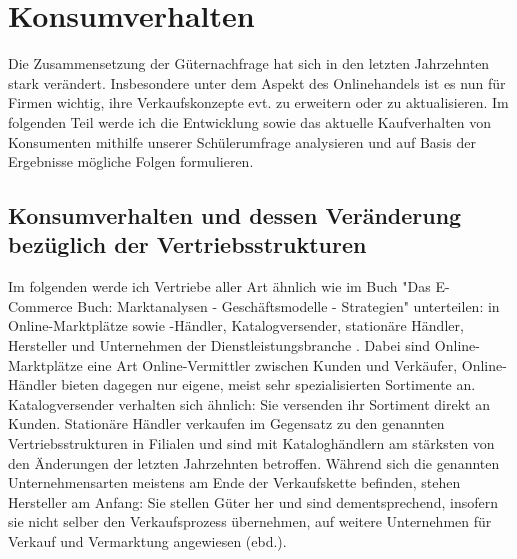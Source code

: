 \documentclass[a4paper, 12pt]{scrartcl}
\makeatletter
\newenvironment{folding}{\endgroup}{\begingroup \def \@currenvir{folding}\edef \@currenvline{\on@line}}
\makeatother
\begin{document}
        
        
        
        
        
        \newpage
        
        
        
    \section{Konsumverhalten}
    
    
    
    Die Zusammensetzung der Güternachfrage hat sich in den letzten Jahrzehnten stark verändert. Insbesondere unter dem Aspekt des Onlinehandels ist es nun für Firmen wichtig, ihre Verkaufskonzepte evt. zu erweitern oder zu aktualisieren. Im folgenden Teil werde ich die Entwicklung sowie das aktuelle Kaufverhalten von Konsumenten mithilfe unserer Schülerumfrage analysieren und auf Basis der Ergebnisse mögliche Folgen formulieren.

    
    
    
        \subsection{Konsumverhalten und dessen Veränderung bezüglich der Vertriebsstrukturen}
          
          
          
          
       
\begin{folding} %

Im folgenden werde ich Vertriebe aller Art ähnlich wie im Buch "Das E-Commerce Buch: Marktanalysen - Geschäftsmodelle - Strategien" unterteilen: in Online-Marktplätze sowie -Händler, Katalogversender, stationäre Händler, Hersteller und Unternehmen der Dienstleistungsbranche \cite[S. 15ff]{Graf}. Dabei sind Online-Marktplätze eine Art Online-Vermittler zwischen Kunden und Verkäufer, Online-Händler bieten dagegen nur eigene, meist sehr spezialisierten Sortimente an. Katalogversender verhalten sich ähnlich: Sie versenden ihr Sortiment direkt an Kunden. Stationäre Händler verkaufen im Gegensatz zu den genannten Vertriebsstrukturen in Filialen und sind mit Kataloghändlern am stärksten von den Änderungen der letzten Jahrzehnten betroffen. Während sich die genannten Unternehmensarten meistens am Ende der Verkaufskette befinden, stehen Hersteller am Anfang: Sie stellen Güter her und sind dementsprechend, insofern sie nicht selber den Verkaufsprozess übernehmen, auf weitere Unternehmen für Verkauf und Vermarktung angewiesen (ebd.). %

\end{folding}
\end{document}
